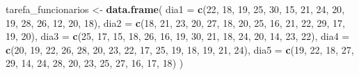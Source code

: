 \documentclass[
  portuguese,
  11pt,
  openany]{book}
\newenvironment{Shaded}{\begin{snugshade}}{\end{snugshade}}
\newcommand{\AttributeTok}[1]{\textcolor[rgb]{0.13,0.29,0.53}{#1}}
\newcommand{\DecValTok}[1]{\textcolor[rgb]{0.00,0.00,0.81}{#1}}
\newcommand{\FunctionTok}[1]{\textcolor[rgb]{0.13,0.29,0.53}{\textbf{#1}}}
\newcommand{\NormalTok}[1]{#1}
\newcommand{\OtherTok}[1]{\textcolor[rgb]{0.56,0.35,0.01}{#1}}
\begin{document}
\begin{Shaded}
\begin{Highlighting}[]
\NormalTok{tarefa\_funcionarios }\OtherTok{\textless{}{-}} \FunctionTok{data.frame}\NormalTok{(}
  \AttributeTok{dia1 =} \FunctionTok{c}\NormalTok{(}\DecValTok{22}\NormalTok{, }\DecValTok{18}\NormalTok{, }\DecValTok{19}\NormalTok{, }\DecValTok{25}\NormalTok{, }\DecValTok{30}\NormalTok{, }\DecValTok{15}\NormalTok{, }\DecValTok{21}\NormalTok{, }\DecValTok{24}\NormalTok{, }\DecValTok{20}\NormalTok{, }\DecValTok{19}\NormalTok{, }\DecValTok{28}\NormalTok{, }\DecValTok{26}\NormalTok{, }\DecValTok{12}\NormalTok{, }\DecValTok{20}\NormalTok{, }\DecValTok{18}\NormalTok{),}
  \AttributeTok{dia2 =} \FunctionTok{c}\NormalTok{(}\DecValTok{18}\NormalTok{, }\DecValTok{21}\NormalTok{, }\DecValTok{23}\NormalTok{, }\DecValTok{20}\NormalTok{, }\DecValTok{27}\NormalTok{, }\DecValTok{18}\NormalTok{, }\DecValTok{20}\NormalTok{, }\DecValTok{25}\NormalTok{, }\DecValTok{16}\NormalTok{, }\DecValTok{21}\NormalTok{, }\DecValTok{22}\NormalTok{, }\DecValTok{29}\NormalTok{, }\DecValTok{17}\NormalTok{, }\DecValTok{19}\NormalTok{, }\DecValTok{20}\NormalTok{),}
  \AttributeTok{dia3 =} \FunctionTok{c}\NormalTok{(}\DecValTok{25}\NormalTok{, }\DecValTok{17}\NormalTok{, }\DecValTok{15}\NormalTok{, }\DecValTok{18}\NormalTok{, }\DecValTok{26}\NormalTok{, }\DecValTok{16}\NormalTok{, }\DecValTok{19}\NormalTok{, }\DecValTok{30}\NormalTok{, }\DecValTok{21}\NormalTok{, }\DecValTok{18}\NormalTok{, }\DecValTok{24}\NormalTok{, }\DecValTok{20}\NormalTok{, }\DecValTok{14}\NormalTok{, }\DecValTok{23}\NormalTok{, }\DecValTok{22}\NormalTok{),}
  \AttributeTok{dia4 =} \FunctionTok{c}\NormalTok{(}\DecValTok{20}\NormalTok{, }\DecValTok{19}\NormalTok{, }\DecValTok{22}\NormalTok{, }\DecValTok{26}\NormalTok{, }\DecValTok{28}\NormalTok{, }\DecValTok{20}\NormalTok{, }\DecValTok{23}\NormalTok{, }\DecValTok{22}\NormalTok{, }\DecValTok{17}\NormalTok{, }\DecValTok{25}\NormalTok{, }\DecValTok{19}\NormalTok{, }\DecValTok{18}\NormalTok{, }\DecValTok{19}\NormalTok{, }\DecValTok{21}\NormalTok{, }\DecValTok{24}\NormalTok{),}
  \AttributeTok{dia5 =} \FunctionTok{c}\NormalTok{(}\DecValTok{19}\NormalTok{, }\DecValTok{22}\NormalTok{, }\DecValTok{18}\NormalTok{, }\DecValTok{27}\NormalTok{, }\DecValTok{29}\NormalTok{, }\DecValTok{14}\NormalTok{, }\DecValTok{24}\NormalTok{, }\DecValTok{28}\NormalTok{, }\DecValTok{20}\NormalTok{, }\DecValTok{23}\NormalTok{, }\DecValTok{25}\NormalTok{, }\DecValTok{27}\NormalTok{, }\DecValTok{16}\NormalTok{, }\DecValTok{17}\NormalTok{, }\DecValTok{18}\NormalTok{)}
\NormalTok{)}
\end{Highlighting}
\end{Shaded}
\end{document}
